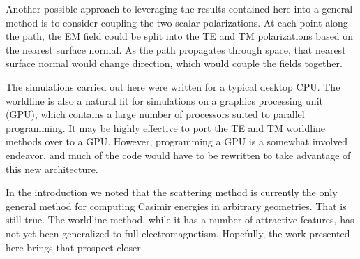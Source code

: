 Another possible approach to leveraging the results contained here into a general method is to consider coupling the two 
scalar polarizations.  
At each point along the path, the EM field could be split into the TE and TM polarizations based 
on the nearest surface normal.
As the path propagates through space, that nearest surface normal would change direction, which would couple the fields 
together.  

The simulations carried out here were written for a typical desktop CPU.
The worldline is also a natural fit for simulations on a graphics processing unit (GPU), 
which contains a large number of processors suited to parallel programming. 
It may be highly effective to port the TE and TM worldline methods over to a GPU.
However, programming a GPU is a somewhat involved endeavor, and much of the code would have to be 
rewritten to take advantage of this new architecture.  

In the introduction we noted that the scattering method is currently the only general
method for computing Casimir energies in arbitrary geometries. That is still true.  The worldline method,
while it has a number of attractive features, has not yet been generalized to full electromagnetism.   
Hopefully, the work presented here brings that prospect closer.  

    
    
